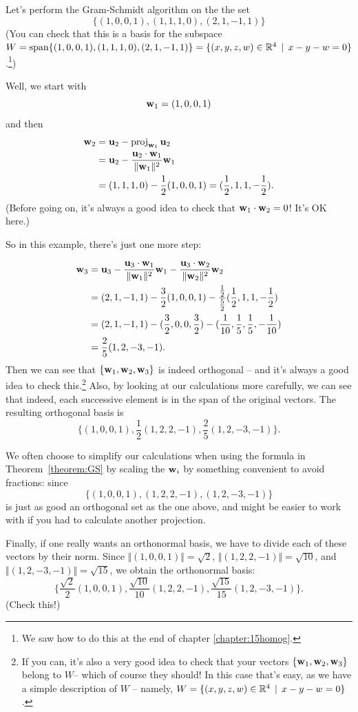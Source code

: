 \begin{myexample}\label{example:GS} Let's perform the Gram-Schmidt algorithm on the 
the set
$$\{ (1,0,0,1), (1,1,1,0), (2,1,-1,1)\}
$$
(You can check that this is a basis for the subspace $W=\textrm{span}\{ (1,0,0,1), (1,1,1,0), (2,1,-1,1)\}=\{(x,y,z,w)\in \mathbb{R}^4\,\mid \, x - y - w = 0 \}$.\footnote{We saw how to do this at the end of chapter \ref{chapter:15homog}.})


Well, we start with 
$$
\mathbf{w}_1 = (1,0,0,1)
$$
and then
\begin{align*}
\mathbf{w}_2 &= \mathbf{u}_2 - \operatorname{proj}_{\mathbf{w}_1}\mathbf{u}_2\\
&= \mathbf{u}_2 - \frac{\mathbf{u}_2\cdot \mathbf{w}_1}{\|\mathbf{w}_1\|^2}\mathbf{w}_1 \\
&= (1,1,1,0) - \frac{1}{2}(1,0,0,1) = (\frac12,1,1,-\frac12). 
\end{align*}
(Before going on, it's always a good idea to check that $\mathbf{w}_1\cdot \mathbf{w}_2 =0$! It's OK here.)

So in this example, there's just one more step:

\begin{align*}
\mathbf{w}_3 &= \mathbf{u}_3 - \frac{\mathbf{u}_3\cdot \mathbf{w}_1}{\|\mathbf{w}_1\|^2}\mathbf{w}_1 - \frac{\mathbf{u}_3\cdot \mathbf{w}_2}{\|\mathbf{w}_2\|^2}\mathbf{w}_2\\
&= (2,1,-1,1) - \frac{3}{2} (1,0,0,1) - \frac{\frac12}{\frac52}
(\frac12,1,1,-\frac12) \\
&= (2,1,-1,1) -(\frac32,0,0,\frac32) - (\frac1{10}, \frac15
 , \frac15, -\frac1{10})\\
&= \frac25(1, 2 , -3 , -1).
\end{align*}
Then we can see that $\{\mathbf{w}_1,\mathbf{w}_2,\mathbf{w}_3\}$ is indeed orthogonal -- and it's always a good idea to check this.\footnote{If you can, it's also a very good idea to check that your vectors $\{\mathbf{w}_1,\mathbf{w}_2,\mathbf{w}_3\}$ belong to $W$-- which of course they should! In this case that's easy, as we have a simple description of $W$ -- namely, $W=\{(x,y,z,w)\in \mathbb{R}^4\,\mid \, x - y - w = 0 \}$.}  Also,
by looking at our calculations more carefully, we can see that indeed,
each successive element is in the span of the original vectors. 
The resulting orthogonal basis is
$$
\{ (1,0,0,1), \frac12(1,2,2,-1), \frac25(1,2,-3,-1)\}.
$$  

\begin{remark} We often choose to simplify our calculations when using the formula in Theorem~\ref{theorem:GS} by scaling the 
$\mathbf{w}_i$ by something convenient to avoid fractions: since 
$$
\{ (1,0,0,1), (1,2,2,-1), (1,2,-3,-1)\}
$$
is just as good an orthogonal set as the one above, and might be
easier to work with if you had to calculate another projection.
\end{remark}

\medskip
Finally, if one really wants  an orthonormal basis, we have to divide each 
of these vectors by their norm.  Since 
$
\Vert (1,0,0,1) \Vert = \sqrt{2}$,  $\Vert  (1,2,2,-1) \Vert =   \sqrt{10}$, and $ \Vert  (1,2,-3,-1) \Vert =   \sqrt{15} $, we obtain the orthonormal basis:
$$
\{ \frac{\sqrt{2}}{2}(1,0,0,1), \frac{\sqrt{10}}{ 10 }(1,2,2,-1), \frac{\sqrt{15}}{15}(1,2,-3,-1)\}.
$$
(Check this!)
\end{myexample}




